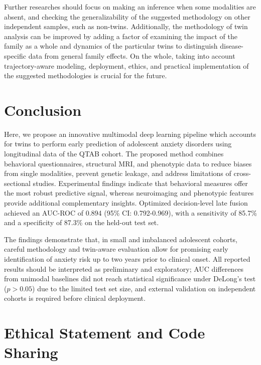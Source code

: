 \documentclass[10pt,letterpaper]{article}
\newcommand{\hlpar}[1]{\leavevmode\colorbox{yellow!30}{\parbox{\dimexpr\linewidth-2\fboxsep\relax}{#1}}\vspace{2pt}}
\begin{document}
Further researches should focus on making an inference when some modalities are absent, and checking the generalizability of the suggested methodology on other independent samples, such as non-twins. Additionally, the methodology of twin analysis can be improved by adding a factor of examining the impact of the family as a whole and dynamics of the particular twins to distinguish disease-specific data from general family effects. On the whole, taking into account trajectory-aware modeling, deployment, ethics, and practical implementation of the suggested methodologies is crucial for the future.
                                                                                                                                                                          \section*{Conclusion}
                                                                                                                                                                           Here, we propose an innovative multimodal deep learning pipeline which accounts for twins to perform early prediction of adolescent anxiety disorders using longitudinal data of the QTAB cohort. The proposed method combines behavioral questionnaires, structural MRI, and phenotypic data to reduce biases from single modalities, prevent genetic leakage, and address limitations of cross-sectional studies. Experimental findings indicate that behavioral measures offer the most robust predictive signal, whereas neuroimaging and phenotypic features provide additional complementary insights. Optimized decision-level late fusion achieved an AUC-ROC of 0.894 (95\% CI: 0.792-0.969), with a sensitivity of 85.7\% and a specificity of 87.3\% on the held-out test set.
\hlpar{The findings demonstrate that, in small and imbalanced adolescent cohorts, careful methodology and twin-aware evaluation allow for promising early identification of anxiety risk up to two years prior to clinical onset. All reported results should be interpreted as preliminary and exploratory; AUC differences from unimodal baselines did not reach statistical significance under DeLong's test ($p > 0.05$) due to the limited test set size, and external validation on independent cohorts is required before clinical deployment.}
\section*{Ethical Statement and Code Sharing}
\end{document}
